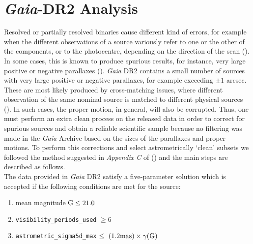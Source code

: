 
\section{\textit{Gaia}-DR2 Analysis}\label{sec:CleaningProcess}

Resolved or partially resolved binaries cause different kind of errors, for example when the different observations of a source variously refer to one or the other of the components, or to the photocentre, depending on the direction of the scan  (\citeyear{2018arXiv180409366L}). In some cases, this is known to produce spurious results, for instance, very large positive or negative parallaxes  (\citeyear{2017A&A...599A..50A}). \textit{Gaia} DR2 contains a small number of sources with very large positive or negative parallaxes, for example exceeding $\pm 1$ arcsec. These are most likely produced by cross-matching issues, where different observation of the same nominal source is matched to different physical sources  (\citeyear{2018arXiv180409366L}). In such cases, the proper motion, in general, will also be corrupted. Thus, one must perform an extra clean process on the released data in order to correct for spurious sources and obtain a reliable scientific sample because no filtering was made in the \textit{Gaia} Archive based on the sizes of the parallaxes and proper motions. To perform this corrections and select astrometrically `clean' subsets we followed the method suggested in \textit{Appendix C} of  (\citeyear{2018arXiv180409366L}) and the main steps are described as follows.\\

The data provided in \textit{Gaia} DR2 satisfy a five-parameter solution which is accepted if the following conditions are met for the source:

\begin{enumerate}[label=(\roman*)]
\item mean magnitude $\textnormal{G} \leq 21.0$
\item \texttt{visibility\_periods\_used} $\geq 6$
\item \texttt{astrometric\_sigma5d\_max} $\leq~(1.2\textnormal{mas})\times\gamma(\textnormal{G})$
\end{enumerate}

